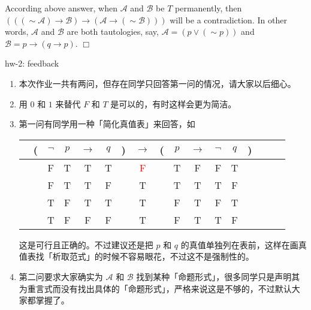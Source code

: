 \documentclass[UTF8,12pt,a4paper]{ctexart}
\newcommand{\negs}{\sim\!}
\begin{document}
According above answer, when $\mathscr{A}$ and $\mathscr{B}$ be $T$ permanently, then $(((\negs \mathscr{A}) \to \mathscr{B})  \to (\mathscr{A} \to (\negs \mathscr{B})))$ will be a contradiction.
In other words, $\mathscr{A}$ and $\mathscr{B}$ are both tautologies, say, 
$\mathscr{A} = (p \lor  (\negs p))$ and $\mathscr{B} = p \to (q \to p)$.
\hfill $\Box$


\vspace{1em}
\dotfill hw-2: feedback
\dotfill

\begin{enumerate}
\item 本次作业一共有两问，但存在同学只回答第一问的情况，请大家以后细心。
	
\item 用 $0$ 和 $1$ 来替代 $F$ 和 $T$ 是可以的，有时这样会更为简洁。
	
\item 第一问有同学用一种「简化真值表」来回答，如
\begin{center} 
	\begin{tabular}{@{ }c@{ }@{ }c  c@{ }@{}c@{}@{ }c@{ }@{ }c@{ }@{ }c@{ }@{ }c@{ }@{}c@{}@{ }c@{ }@{}c@{}@{ }c@{ }@{ }c@{ }@{ }c@{ }@{ }c@{ }@{}c@{}@{ }c}
	& ( & $\lnot$ & $p$ & $\rightarrow$ & $q$ & ) & $\rightarrow$ & ( & $p$ & $\rightarrow$ & $\lnot$ & $q$ & ) & \\
	\hline 
	&  & F & T & T & T &  & \textcolor{red}{F} &  & T & F & F & T &  & \\
	&  & F & T & T & F &  & {T} &  & T & T & T & F &  & \\
	&  & T & F & T & T &  & {T} &  & F & T & F & T &  & \\
	&  & T & F & F & F &  & {T} &  & F & T & T & F &  & \\
	\end{tabular}
\end{center}
这是可行且正确的。不过建议还是把 $p$ 和 $q$ 的真值单独列在表前，这样在画真值表找「析取范式」的时候不容易眼花，不过这不是强制性的。
	
\item 第二问要求大家确实为 $\mathscr{A}$ 和 $\mathscr{B}$ 找到某种「命题形式」，很多同学只是声明其为重言式而没有找出具体的「命题形式」，严格来说这是不够的，不过默认大家都掌握了。
\end{enumerate}
\end{document}
